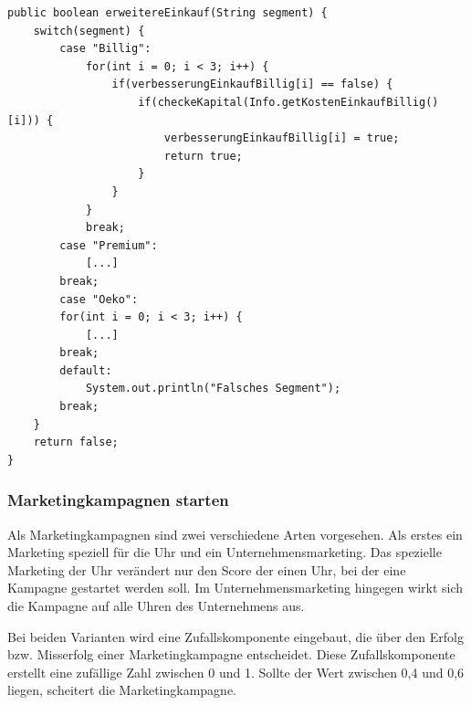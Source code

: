 \lstset{language=Java}
\begin{lstlisting}[caption={Einkauf erweitern},captionpos=b]
public boolean erweitereEinkauf(String segment) {
	switch(segment) {
		case "Billig":
			for(int i = 0; i < 3; i++) {
				if(verbesserungEinkaufBillig[i] == false) {
					if(checkeKapital(Info.getKostenEinkaufBillig()[i])) {
						verbesserungEinkaufBillig[i] = true;
						return true;
					}
				}
			}
			break;
		case "Premium":
			[...]
		break;
		case "Oeko":
		for(int i = 0; i < 3; i++) {
			[...]
		break;
		default:
			System.out.println("Falsches Segment");
		break;
	}
	return false;
}
\end{lstlisting}

\subsubsection{Marketingkampagnen starten}
Als Marketingkampagnen sind zwei verschiedene Arten vorgesehen. Als erstes ein Marketing speziell für die Uhr und ein Unternehmensmarketing. Das spezielle Marketing der Uhr verändert nur den Score der einen Uhr, bei der eine Kampagne gestartet werden soll. Im Unternehmensmarketing hingegen wirkt sich die Kampagne auf alle Uhren des Unternehmens aus.

Bei beiden Varianten wird eine Zufallskomponente eingebaut, die über den Erfolg bzw. Misserfolg einer Marketingkampagne entscheidet. Diese Zufallskomponente erstellt eine zufällige Zahl zwischen 0 und 1. Sollte der Wert zwischen 0,4 und 0,6 liegen, scheitert die Marketingkampagne.

